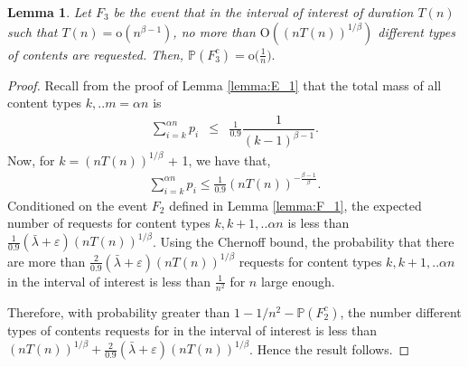 \documentclass[10pt, conference, letterpaper]{IEEEtran}
\newtheorem{lemma}{Lemma}
\def \OO {\mathrm{O}}
\def \oo {\mathrm{o}}
\begin{document}
\begin{lemma}
	\label{lemma:types_of_arrivals}
	Let $F_3$ be the event that in the interval of interest of duration $T(n)$ such that $T(n) = \oo(n^{\beta-1})$, no more than $\OO((nT(n))^{1/\beta})$ different types of contents are requested. Then,
	$
	\mathbb{P}(F_3^c) = \oo\big(\frac{1}{n}\big).
	$
\end{lemma}
\begin{proof}
	Recall from the proof of Lemma \ref{lemma:E_1} that the total mass of all content types $k, .. m=\alpha n$ is
	\begin{eqnarray*}
		\sum_{i=k}^{\alpha n} p_i &\leq& \frac{1}{0.9} \dfrac{1}{(k-1)^{\beta-1}}.
	\end{eqnarray*}
	Now, for $k = (nT(n))^{1/\beta}$ + 1, we have that,
	\begin{eqnarray*}
		\sum_{i=k}^{\alpha n} p_i  \leq \frac{1}{0.9} (nT(n))^{-\frac{\beta-1}{\beta}}.
	\end{eqnarray*}
	Conditioned on the event $F_2$ defined in Lemma \ref{lemma:F_1}, the expected number of requests for content types $k, k+1, .. \alpha n$ is less than $\frac{1}{0.9} (\bar{\lambda} + \varepsilon) (nT(n))^{1/\beta}$. Using the Chernoff bound, the probability that there are more than $\frac{2}{0.9} (\bar{\lambda} + \varepsilon) (nT(n))^{1/\beta}$ requests for content types $k, k+1, .. \alpha n$ in the interval of interest is less than $ \frac{1}{n^2}$ for $n$ large enough.
	
	Therefore, with probability greater than $ 1-1/n^2 - \mathbb{P}(F_2^c)$, the number different types of contents requests for in the interval of interest is less than $ (nT(n))^{1/\beta} + \frac{2}{0.9} (\bar{\lambda} + \varepsilon) (nT(n))^{1/\beta}$. Hence the result follows.
\end{proof}
\end{document}
